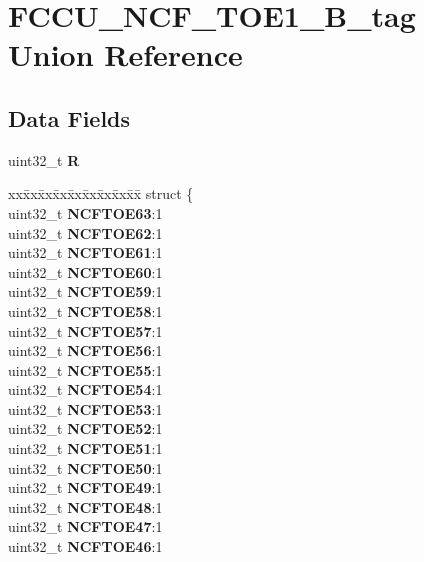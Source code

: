 \hypertarget{unionFCCU__NCF__TOE1__32B__tag}{}\section{F\+C\+C\+U\+\_\+\+N\+C\+F\+\_\+\+T\+O\+E1\+\_\+B\+\_\+tag Union Reference}
\label{unionFCCU__NCF__TOE1__32B__tag}
\subsection*{Data Fields}
\begin{DoxyCompactItemize}
\item 
\mbox{\label{unionFCCU__NCF__TOE1__32B__tag_accbd53e96b068299ff0c9afad8e76b54}} 
uint32\+\_\+t {\bfseries R}
\item 
\mbox{\label{unionFCCU__NCF__TOE1__32B__tag_a6fa67dabb0d84c0b1c38670276584562}} 
\begin{tabbing}
xx\=xx\=xx\=xx\=xx\=xx\=xx\=xx\=xx\=\kill
struct \{\\
\>uint32\_t {\bfseries NCFTOE63}:1\\
\>uint32\_t {\bfseries NCFTOE62}:1\\
\>uint32\_t {\bfseries NCFTOE61}:1\\
\>uint32\_t {\bfseries NCFTOE60}:1\\
\>uint32\_t {\bfseries NCFTOE59}:1\\
\>uint32\_t {\bfseries NCFTOE58}:1\\
\>uint32\_t {\bfseries NCFTOE57}:1\\
\>uint32\_t {\bfseries NCFTOE56}:1\\
\>uint32\_t {\bfseries NCFTOE55}:1\\
\>uint32\_t {\bfseries NCFTOE54}:1\\
\>uint32\_t {\bfseries NCFTOE53}:1\\
\>uint32\_t {\bfseries NCFTOE52}:1\\
\>uint32\_t {\bfseries NCFTOE51}:1\\
\>uint32\_t {\bfseries NCFTOE50}:1\\
\>uint32\_t {\bfseries NCFTOE49}:1\\
\>uint32\_t {\bfseries NCFTOE48}:1\\
\>uint32\_t {\bfseries NCFTOE47}:1\\
\>uint32\_t {\bfseries NCFTOE46}:1\\

\end{tabbing}
\end{DoxyCompactItemize}
